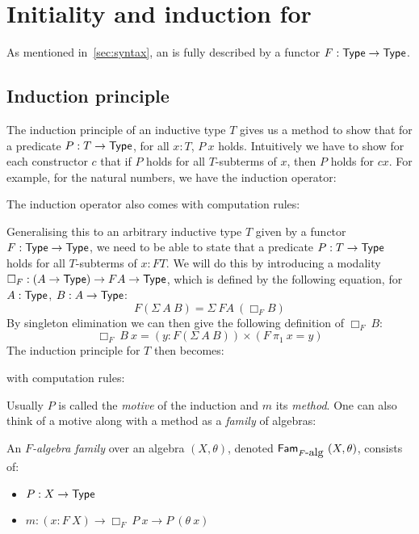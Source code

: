 \documentclass[a4paper,10pt]{article}
\begin{document}
\section{Initiality and induction for \oits}
\label{sec:oits}

As mentioned in~\cref{sec:syntax}, an \oit is fully described by a
functor $F : \mathsf{Type} \to \mathsf{Type}$.

\subsection{Induction principle}
\label{sec:oitinduction}

The induction principle of an inductive type $T$ gives us a method to
show that for a predicate $P : T \to \mathsf{Type}$, for all $x : T$, $P\ x$
holds. Intuitively we have to show for each constructor $c$ that if
$P$ holds for all $T$-subterms of $x$, then $P$ holds for $c x$. For
example, for the natural numbers, we have the induction operator:


The induction operator also comes with computation rules:


Generalising this to an arbitrary inductive type $T$ given by a
functor $F : \mathsf{Type} \to \mathsf{Type}$, we need to be able to state that a
predicate $P : T \to \mathsf{Type}$ holds for all $T$-subterms of $x : FT$. We
will do this by introducing a modality
$\Box_F : (A \to \mathsf{Type}) \to FA \to \mathsf{Type}$, which is defined by the
following equation, for $A : \mathsf{Type}$, $B : A \to \mathsf{Type}$:
$$
F (\Sigma\ A\ B) = \Sigma\ FA\ (\Box_{F} B)
$$
By singleton elimination we can then give the following definition of $\Box_{F}\ B$:
$$
\Box_{F}\ B\ x = (y : F (\Sigma\ A\ B)) \times (F\ \pi_1\ x = y)
$$
The induction principle for $T$ then becomes:


with computation rules:


Usually $P$ is called the \emph{motive} of the induction and $m$ its
\emph{method}. One can also think of a motive along with a method as a
\emph{family} of algebras:

\begin{defn}
  An \emph{$F$-algebra family} over an algebra $(X,\theta)$, denoted
  $\mathsf{Fam}_{F\mbox{-alg}}\ (X,\theta)$, consists of:

  \begin{itemize}
  \item $P : X \to \mathsf{Type}$
  \item $m : (x : F\ X) \to \Box_F\ P\ x \to P\ (\theta\ x)$
  \end{itemize}
\end{defn}
\end{document}
